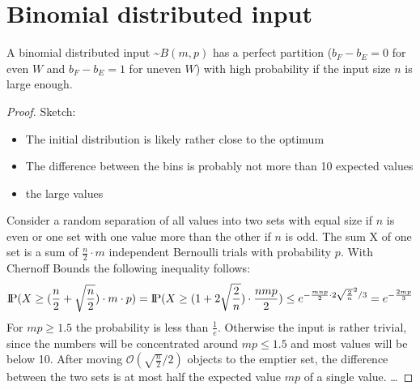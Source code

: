 
\section{Binomial distributed input}
\begin{lemma}\label{lemma:BinomialSolvable}
    A binomial distributed input \textasciitilde$B(m,p)$ has a perfect partition ($b_F - b_E = 0$ for even $W$ and $b_F - b_E = 1$ for uneven $W$) with high probability if the input size $n$ is large enough.
\end{lemma}
\begin{proof}
    Sketch:
    \begin{itemize}
        \item The initial distribution is likely rather close to the optimum
        \item The difference between the bins is probably not more than 10 expected values
        \item the large values
    \end{itemize}
    Consider a random separation of all values into two sets with equal size if $n$ is even or one set with one value more than the other if $n$ is odd. The sum X of one set is a sum of $\frac{n}{2}\cdot m$ independent Bernoulli trials with probability $p$. With Chernoff Bounds the following inequality follows:
    \[\text{I\kern-0.15em P}(X\ge(\frac{n}{2}+\sqrt{\frac{n}{2}})\cdot m \cdot p) = \text{I\kern-0.15em P}(X\ge(1+2\sqrt{\frac{2}{n}})\cdot \frac{nmp}{2}) \le e^{-\frac{mnp}{2}\cdot2\sqrt{\frac{2}{n}}^2 /3} = e^{-\frac{2mp}{3}}\]
    For $mp\ge1.5$ the probability is less than $\frac{1}{e}$. Otherwise the input is rather trivial, since the numbers will be concentrated around $mp\le1.5$ and most values will be below 10.\newline
    After moving $\mathcal{O}(\sqrt{\frac{n}{2}}/2)$ objects to the emptier set, the difference between the two sets is at most half the expected value $mp$ of a single value.
    \dots
\end{proof}


